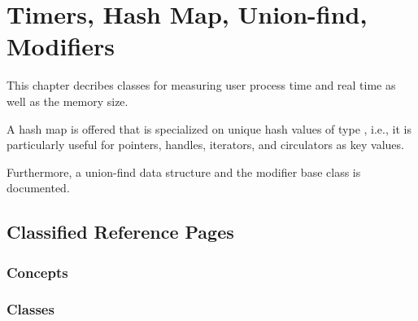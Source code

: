 %
%
\chapter{Timers, Hash Map, Union-find, Modifiers}
\label{chap:union_find}
\label{chap:hash_map}


This chapter decribes classes for measuring user process time and real time
as well as the memory size.

A hash map  is offered that is specialized
on unique hash values of type , i.e., it is
particularly useful for pointers, handles, iterators, and circulators
as key values.

Furthermore, a union-find data structure and the modifier base class
is documented.

\section{Classified Reference Pages}

\subsection*{Concepts}


\subsection*{Classes}

 \\
 \\

\\



